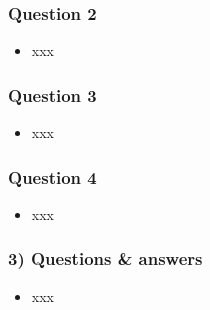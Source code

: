 \documentclass[english,14pt]{beamer}
\begin{document}

\begin{frame}[fragile]

\frametitle{Question 2}

\begin{itemize}
	\item xxx
\end{itemize}

\end{frame}


\begin{frame}[fragile]

\frametitle{Question 3}

\begin{itemize}
	\item xxx
\end{itemize}

\end{frame}


\begin{frame}[fragile]

\frametitle{Question 4}

\begin{itemize}
	\item xxx
\end{itemize}

\end{frame}


\begin{frame}[fragile]

\frametitle{3) Questions \& answers}

\begin{itemize}
	\item xxx
\end{itemize}

\end{frame}
\end{document}
